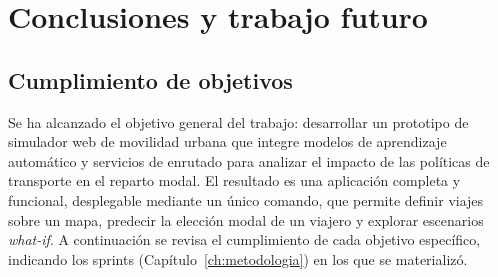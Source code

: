 \chapter{Conclusiones y trabajo futuro}
\label{ch:conclusiones}

\section{Cumplimiento de objetivos}

Se ha alcanzado el objetivo general del trabajo: desarrollar un prototipo de simulador web de movilidad urbana que integre modelos de aprendizaje automático y servicios de enrutado para analizar el impacto de las políticas de transporte en el reparto modal.  El resultado es una aplicación completa y funcional, desplegable mediante un único comando, que permite definir viajes sobre un mapa, predecir la elección modal de un viajero y explorar escenarios \textit{what-if}. A continuación se revisa el cumplimiento de cada objetivo específico, indicando los sprints (Capítulo~\ref{ch:metodologia}) en los que se materializó.


